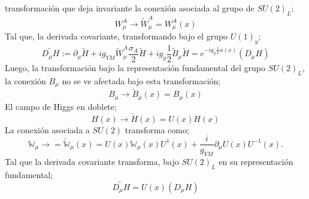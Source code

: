 \documentclass[../main.tex]{subfiles}
\begin{document}
   transformación que deja invariante la conexión asociada al grupo de $SU(2)_L$;
   \begin{equation}
     W^A_\mu \rightarrow \tilde{W}^A_{\mu} = W^A_\mu(x)
    \end{equation}
    Tal que, la derivada covariante, transformando bajo el grupo $U(1)_y$;
    \begin{equation}
      \tilde{D_\mu H} := \partial_\mu \tilde{H} + ig_{YM} \tilde{W}^A_\mu \frac{\sigma_A}{2} \tilde{H} + ig_y \frac{1}{2} \tilde{B}_\mu \tilde{H} = e^{-ig_y\frac{1}{2}\alpha(x)}\left( D_\mu H \right)
    \end{equation}
Luego, la transformación bajo la representación fundamental del grupo $SU(2)_L$, la conexión $B_\mu$ no se ve afectada bajo esta transformación;
\begin{equation}
  B_\mu \rightarrow \tilde{B}_\mu(x) = B_\mu(x)
 \end{equation}
 El campo de Higgs en doblete;
 \begin{equation}
   H(x)\rightarrow \tilde{H}(x) = U(x) H(x)
  \end{equation}
 La conexión asociada a $SU(2)$ transforma como;
 \begin{equation}
   \mathbb{W}_\mu \rightarrow = \tilde{\mathbb{W}}_\mu (x) = U(x)\mathbb{W}_\mu (x)U^{1}(x)+\frac{i}{g_{YM}} \partial_\mu U(x) U^{-1}(x).
  \end{equation}
  Tal que la derivada covariante transforma, bajo $SU(2)_L$ en su representación fundamental;
  \begin{equation}
    \tilde{D_\mu H} = U(x) \left( D_\mu H \right)
   \end{equation}
\end{document}
